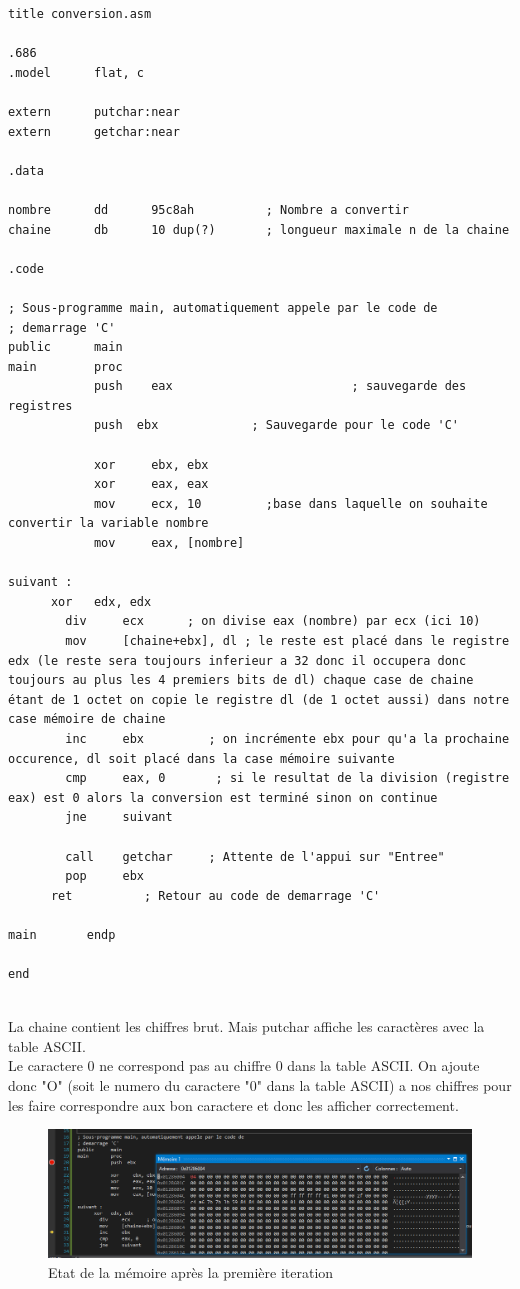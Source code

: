 \documentclass[11pt]{report}
\begin{document}
\begin{lstlisting}
title conversion.asm

.686
.model 		flat, c

extern      putchar:near
extern      getchar:near

.data

nombre      dd      95c8ah          ; Nombre a convertir
chaine      db      10 dup(?)       ; longueur maximale n de la chaine

.code

; Sous-programme main, automatiquement appele par le code de
; demarrage 'C'
public      main
main        proc
			push 	eax							; sauvegarde des registres
			push  ebx             ; Sauvegarde pour le code 'C'

			xor		ebx, ebx
			xor		eax, eax
			mov		ecx, 10         ;base dans laquelle on souhaite convertir la variable nombre
			mov		eax, [nombre]

suivant :
      xor 	edx, edx
	    div	    ecx      ; on divise eax (nombre) par ecx (ici 10)
	    mov     [chaine+ebx], dl ; le reste est placé dans le registre edx (le reste sera toujours inferieur a 32 donc il occupera donc toujours au plus les 4 premiers bits de dl) chaque case de chaine étant de 1 octet on copie le registre dl (de 1 octet aussi) dans notre case mémoire de chaine
	    inc     ebx         ; on incrémente ebx pour qu'a la prochaine occurence, dl soit placé dans la case mémoire suivante
	    cmp     eax, 0       ; si le resultat de la division (registre eax) est 0 alors la conversion est terminé sinon on continue
	    jne     suivant

	    call    getchar     ; Attente de l'appui sur "Entree"
	    pop     ebx
      ret          ; Retour au code de demarrage 'C'

main       endp

end


\end{lstlisting}

La chaine contient les chiffres brut. Mais putchar affiche les caractères avec la table ASCII.
\\Le caractere 0 ne correspond pas au chiffre 0 dans la table ASCII. On ajoute donc "O" (soit le numero du caractere "0" dans la table ASCII) a nos chiffres pour les faire correspondre aux bon caractere et donc les afficher correctement.

\begin{figure}[ht]
\includegraphics[width=12cm]{capture9.PNG}
\caption{Etat de la mémoire après la première iteration}
\end{figure}
\end{document}
